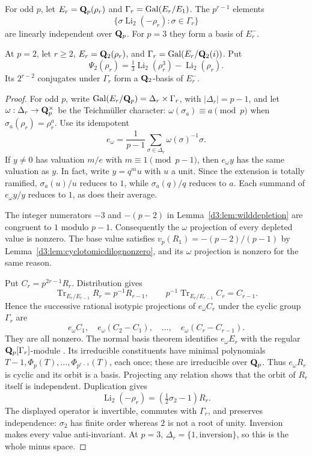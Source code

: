 \begin{proposition}\label{d3:prop:wildorbit}
For odd $p$, let $E_r=\mathbf Q_p(\rho_r)$ and
$\Gamma_r=\operatorname{Gal}(E_r/E_1)$.
The $p^{r-1}$ elements
\[
 \{\sigma\operatorname{Li}_2(-\rho_r):\sigma\in\Gamma_r\}
\]
are linearly independent over $\mathbf Q_p$.
For $p=3$ they form a basis of $E_r^-$.

At $p=2$, let $r\geq2$, $E_r=\mathbf Q_2(\rho_r)$, and
$\Gamma_r=\operatorname{Gal}(E_r/\mathbf Q_2(i))$.
Put
\[
 \Psi_2(\rho_r)=\tfrac13\operatorname{Li}_2(\rho_r^3)
                              -\operatorname{Li}_2(\rho_r).
\]
Its $2^{r-2}$ conjugates under $\Gamma_r$ form a $\mathbf Q_2$-basis of
$E_r^-$.
\end{proposition}
\begin{proof}
For odd $p$, write
$\operatorname{Gal}(E_r/\mathbf Q_p)=\Delta_r\times\Gamma_r$, with $|\Delta_r|=p-1$,
and let $\omega:\Delta_r\to\mathbf Q_p^\times$ be the Teichm\"uller
character: $\omega(\sigma_a)\equiv a\pmod p$ when
$\sigma_a(\rho_r)=\rho_r^a$.
Use its idempotent
\[
 e_\omega=\frac1{p-1}\sum_{\sigma\in\Delta_r}
                        \omega(\sigma)^{-1}\sigma.
\]
If $y\ne0$ has valuation $m/e$ with $m\equiv1\pmod{p-1}$,
then $e_\omega y$ has the same valuation as $y$.
In fact, write $y=q^m u$ with $u$ a unit. Since the extension is
totally ramified, $\sigma_a(u)/u$ reduces to $1$, while
$\sigma_a(q)/q$ reduces to $a$. Each summand of $e_\omega y/y$ reduces to $1$, as does their average.

The integer numerators $-3$ and $-(p-2)$ in
Lemma~\ref{d3:lem:wilddepletion} are congruent to $1$ modulo $p-1$.
Consequently the $\omega$ projection of every depleted value is nonzero.
The base value satisfies
$v_p(R_1)=-(p-2)/(p-1)$ by
Lemma~\ref{d3:lem:cyclotomicdilognonzero}, and its $\omega$ projection
is nonzero for the same reason.

Put $C_r=p^{2r-1}R_r$.
Distribution \cite[Proposition~2.10(1)]{BesserDeJeuAlgorithm} gives
\[
 \operatorname{Tr}_{E_r/E_{r-1}}R_r=p^{-1}R_{r-1},
 \qquad p^{-1}\operatorname{Tr}_{E_r/E_{r-1}}C_r=C_{r-1}.
\]
Hence the successive rational isotypic projections of
$e_\omega C_r$ under the cyclic group $\Gamma_r$ are
\[
 e_\omega C_1,\quad e_\omega(C_2-C_1),\quad\ldots,
 \quad e_\omega(C_r-C_{r-1}).
\]
They are all nonzero. The normal basis theorem identifies
$e_\omega E_r$ with the regular $\mathbf Q_p[\Gamma_r]$-module
\cite[Chapter~I, p.~34]{MilneDuality}.
Its irreducible constituents have minimal polynomials
$T-1,\Phi_p(T),\ldots,\Phi_{p^{r-1}}(T)$, each once;
these are irreducible over $\mathbf Q_p$.
Thus $e_\omega R_r$ is cyclic and its orbit is a basis.
Projecting any relation shows that the orbit of $R_r$ itself
is independent. Duplication gives
\[
 \operatorname{Li}_2(-\rho_r)=(\tfrac12\sigma_2-1)R_r.
\]
The displayed operator is invertible, commutes with $\Gamma_r$,
and preserves independence: $\sigma_2$ has finite order whereas
$2$ is not a root of unity.
Inversion makes every value anti-invariant. At $p=3$,
$\Delta_r=\{1,\text{inversion}\}$, so this is the whole minus space.


\end{proof}
